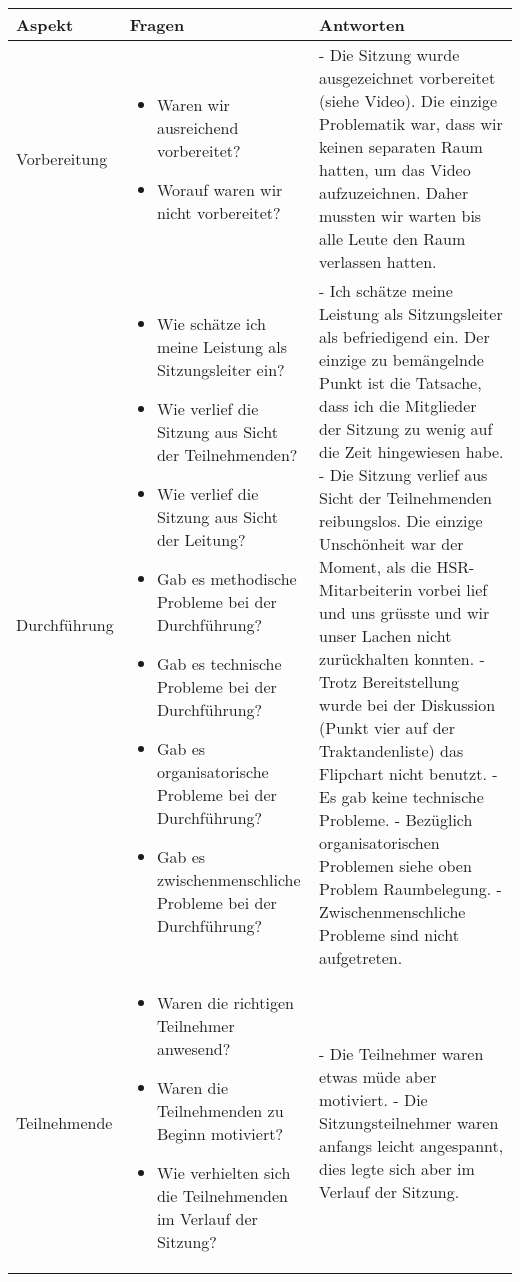 \documentclass[10pt]{article}
\begin{document}
\begin{tabular}{|p{2.2cm}|p{10cm}|p{5cm}|}
\hline
\textbf{Aspekt} & \textbf{Fragen} & \textbf{Antworten} \\ \hline
Vorbereitung & \begin{itemize} \item Waren wir ausreichend vorbereitet? \item Worauf waren wir nicht vorbereitet? \end{itemize} & - Die Sitzung wurde ausgezeichnet vorbereitet (siehe Video). Die einzige Problematik war, dass wir keinen separaten Raum hatten, um das Video aufzuzeichnen. Daher mussten wir warten bis alle Leute den Raum verlassen hatten.  \\ \hline
Durchführung & \begin{itemize} \item Wie schätze ich meine Leistung als Sitzungsleiter ein? \item Wie verlief die Sitzung aus Sicht der Teilnehmenden? \item Wie verlief die Sitzung aus Sicht der Leitung? \item Gab es methodische Probleme bei der Durchführung? \item Gab es technische Probleme bei der Durchführung? \item Gab es organisatorische Probleme bei der Durchführung? \item Gab es zwischenmenschliche Probleme bei der Durchführung?\end{itemize} & - Ich schätze meine Leistung als Sitzungsleiter als befriedigend ein. Der einzige zu bemängelnde Punkt ist die Tatsache, dass ich die Mitglieder der Sitzung zu wenig auf die Zeit hingewiesen habe. \newline - Die Sitzung verlief aus Sicht der Teilnehmenden reibungslos. Die einzige Unschönheit war der Moment, als die HSR-Mitarbeiterin vorbei lief und uns grüsste und wir unser Lachen nicht zurückhalten konnten. \newline -  Trotz Bereitstellung wurde bei der Diskussion (Punkt vier auf der Traktandenliste) das Flipchart nicht benutzt. \newline - Es gab keine technische Probleme. \newline - Bezüglich organisatorischen Problemen siehe oben Problem Raumbelegung. \newline - Zwischenmenschliche Probleme sind nicht aufgetreten. \\ \hline
Teilnehmende & \begin{itemize} \item Waren die richtigen Teilnehmer anwesend? \item Waren die Teilnehmenden zu Beginn motiviert? \item Wie verhielten sich die Teilnehmenden im Verlauf der Sitzung? \end{itemize} & - Die Teilnehmer waren etwas müde aber motiviert. \newline - Die Sitzungsteilnehmer waren anfangs leicht angespannt, dies legte sich aber im Verlauf der Sitzung. \\ \hline

\end{tabular}
\end{document}
